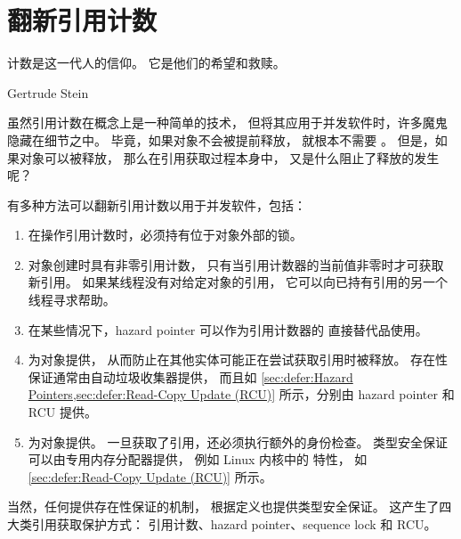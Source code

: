 
\section{翻新引用计数}
\label{sec:together:Refurbish Reference Counting}
%
\epigraph{计数是这一代人的信仰。
	  它是他们的希望和救赎。}
	 {Gertrude Stein}

虽然引用计数在概念上是一种简单的技术，
但将其应用于并发软件时，许多魔鬼隐藏在细节之中。
毕竟，如果对象不会被提前释放，
就根本不需要
。
但是，如果对象可以被释放，
那么在引用获取过程本身中，
又是什么阻止了释放的发生呢？

有多种方法可以翻新引用计数以用于并发软件，包括：

\begin{enumerate}
\item	在操作引用计数时，必须持有位于对象外部的锁。
\item	对象创建时具有非零引用计数，
	只有当引用计数器的当前值非零时才可获取新引用。
	如果某线程没有对给定对象的引用，
	它可以向已持有引用的另一个线程寻求帮助。
\item	在某些情况下，hazard pointer 可以作为引用计数器的
	直接替代品使用。
\item	为对象提供，
	从而防止在其他实体可能正在尝试获取引用时被释放。
	存在性保证通常由自动垃圾收集器提供，
	而且如
	\cref{sec:defer:Hazard Pointers,sec:defer:Read-Copy Update (RCU)}
	所示，分别由 hazard pointer 和 RCU 提供。
\item	为对象提供。
	一旦获取了引用，还必须执行额外的身份检查。
	类型安全保证可以由专用内存分配器提供，
	例如 Linux 内核中的
	 特性，
	如 \cref{sec:defer:Read-Copy Update (RCU)} 所示。
\end{enumerate}

当然，任何提供存在性保证的机制，
根据定义也提供类型安全保证。
这产生了四大类引用获取保护方式：
引用计数、hazard pointer、sequence lock 和 RCU\@。

\QuickQuizEnd

